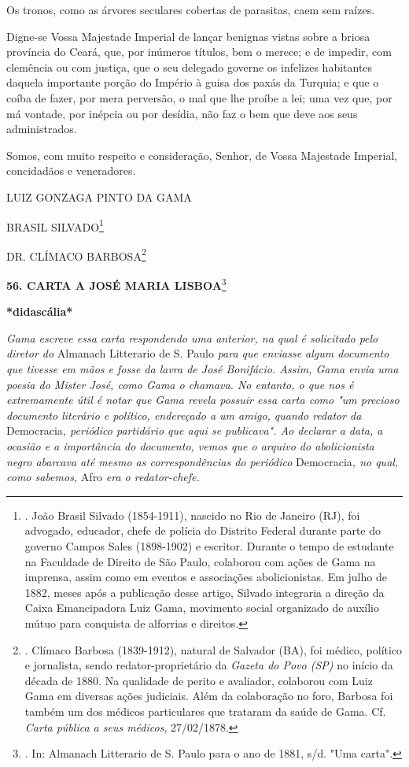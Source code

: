 Os tronos, como as árvores seculares cobertas de parasitas, caem sem
raízes.

Digne-se Vossa Majestade Imperial de lançar benignas vistas sobre a
briosa província do Ceará, que, por inúmeros títulos, bem o merece; e de
impedir, com clemência ou com justiça, que o seu delegado governe os
infelizes habitantes daquela importante porção do Império à guisa dos
paxás da Turquia; e que o coíba de fazer, por mera perversão, o mal que
lhe proíbe a lei; uma vez que, por má vontade, por inépcia ou por
desídia, não faz o bem que deve aos seus administrados.

Somos, com muito respeito e consideração, Senhor, de Vossa Majestade
Imperial, concidadãos e veneradores.

LUIZ GONZAGA PINTO DA GAMA

BRASIL SILVADO\footnote{. João Brasil Silvado (1854-1911), nascido no
  Rio de Janeiro (RJ), foi advogado, educador, chefe de polícia do
  Distrito Federal durante parte do governo Campos Sales (1898-1902) e
  escritor. Durante o tempo de estudante na Faculdade de Direito de São
  Paulo, colaborou com ações de Gama na imprensa, assim como em eventos
  e associações abolicionistas. Em julho de 1882, meses após a
  publicação desse artigo, Silvado integraria a direção da Caixa
  Emancipadora Luiz Gama, movimento social organizado de auxílio mútuo
  para conquista de alforrias e direitos.}

DR. CLÍMACO BARBOSA\footnote{. Clímaco Barbosa (1839-1912), natural de
  Salvador (BA), foi médico, político e jornalista, sendo
  redator-proprietário da \emph{Gazeta do Povo (SP)} no início da década
  de 1880. Na qualidade de perito e avaliador, colaborou com Luiz Gama
  em diversas ações judiciais. Além da colaboração no foro, Barbosa foi
  também um dos médicos particulares que trataram da saúde de Gama. Cf.
  \emph{Carta pública a seus médicos}, 27/02/1878.}

\textbf{56. CARTA A JOSÉ
MARIA LISBOA}\footnote{. In: Almanach Litterario de S. Paulo para o ano
  de 1881, s/d. "Uma carta".}

\textbf{*didascália*}

\emph{Gama escreve essa carta respondendo uma anterior, na qual é
solicitado pelo diretor do} Almanach Litterario de S. Paulo \emph{para
que enviasse algum documento que tivesse em mãos e fosse da lavra de
José Bonifácio. Assim, Gama envia uma poesia do Mister José, como Gama o
chamava. No entanto, o que nos é extremamente útil é notar que Gama
revela possuir essa carta como "um precioso documento literário e
político, endereçado a um amigo, quando redator da} Democracia\emph{,
periódico partidário que aqui se publicava". Ao declarar a data, a
ocasião e a importância do documento, vemos que o arquivo do
abolicionista negro abarcava até mesmo as correspondências do periódico}
Democracia\emph{, no qual, como sabemos,} Afro \emph{era o
redator-chefe.}

